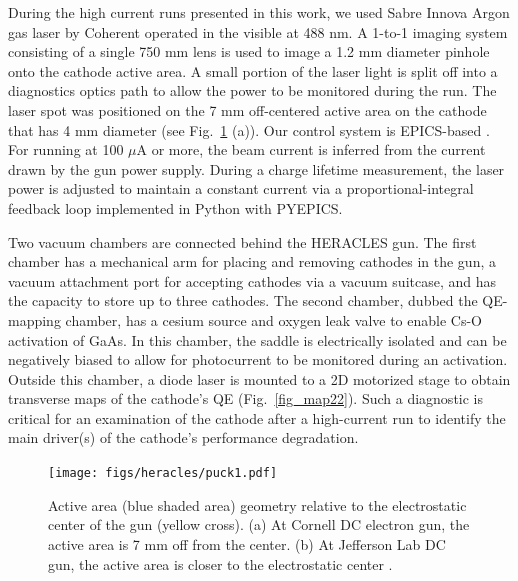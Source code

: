 During the high current runs presented in this work, we used Sabre Innova Argon gas laser by Coherent operated in the visible at 488 nm. A 1-to-1 imaging system consisting of a single 750 mm lens is used to image a 1.2 mm diameter pinhole onto the cathode active area. A small portion of the laser light is split off into a diagnostics optics path to allow the power to be monitored during the run.
The laser spot was positioned on the 7 mm off-centered active area on the cathode that has 4 mm diameter (see Fig.~\ref{fig_puck22} (a)).
Our control system is EPICS-based \cite{dalesio1991epics}. For running at 100 $\mu$A or more, the beam current is inferred from the current drawn by the gun power supply. During a charge lifetime measurement, the laser power is adjusted to maintain a constant current via a proportional-integral feedback loop implemented in Python with PYEPICS.

Two vacuum chambers are connected behind the HERACLES gun.
The first chamber has a mechanical arm for placing and removing cathodes in the gun, a vacuum attachment port for accepting cathodes via a vacuum suitcase, and has the capacity to store up to three cathodes. The second chamber, dubbed the QE-mapping chamber, has a cesium source and oxygen leak valve to enable Cs-O activation of GaAs. In this chamber, the saddle is electrically isolated and can be negatively biased to allow for photocurrent to be monitored during an activation. Outside this chamber, a diode laser is mounted to a 2D motorized stage to obtain transverse maps of the cathode's QE (Fig.~\ref{fig_map22}). Such a diagnostic is critical for an examination of the cathode after a high-current run to identify the main driver(s) of the cathode's performance degradation.

\begin{figure}
	\centering
	\texttt{[image: figs/heracles/puck1.pdf]}
	\caption{Active area (blue shaded area) geometry relative to the electrostatic center of the gun (yellow cross). (a) At Cornell DC electron gun, the active area is 7 mm off from the center. (b) At Jefferson Lab DC gun, the active area is closer to the electrostatic center \cite{grames2011_ChargeFluenceLifetime}.}
	\label{fig_puck22}
\end{figure}




